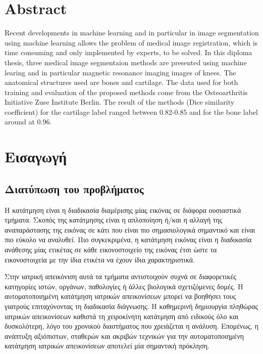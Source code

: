 \documentclass[a4paper,12pt]{article}
\begin{document}
\section*{Abstract}

Recent developments in machine learning and in particular in image segmentation
using machine learning allows the problem of medical image registration, which
is time consuming and only implemented by experts, to be solved. In this diploma
thesis, three medical image segmentaion methods are presented using machine
learing and in particular magnetic resonance imaging images of knees. The
anatomical structures used are bones and cartilage. The data used for both
training and evaluation of the proposed methods come from the Osteoarthritis
Initiative Zuse Institute Berlin. The result of the methods (Dice similarity
coefficient) for the cartilage label ranged between 0.82-0.85 and for the bone
label around at 0.96. 

\tableofcontents

\listoffigures

\listoftables

\section{Εισαγωγή}

\subsection{Διατύπωση του προβλήματος}

Η κατάτμηση είναι η διαδικασία διαμέρισης μίας εικόνας σε διάφορα ουσιαστικά
τμήματα. Σκοπός της κατάτμησης είναι η απλοποίηση ή/και η αλλαγή της
αναπαράστασης της εικόνας σε κάτι που είναι πιο σημασιολογικά σημαντικό και
είναι πιο εύκολο να αναλυθεί. Πιο συγκεκριμένα, η κατάτμηση εικόνας είναι η
διαδικασία ανάθεσης μίας ετικέτας σε κάθε εικονοστοιχείο της εικόνας έτσι ώστε
τα εικονοστοιχεία με την ίδια ετικέτα να έχουν ίδια χαρακτηριστικά.

Στην ιατρική απεικόνιση αυτά τα τμήματα αντιστοιχούν συχνά σε διαφορετικές
κατηγορίες ιστών, οργάνων, παθολογίες ή άλλες βιολογικά σχετιζόμενες δομές. Η
αυτοματοποιημένη κατάτμηση ιατρικών απεικονίσεων μπορεί να βοηθήσει τους
γιατρούς επιταχύνοντας τη διαδικασία διάγνωσης. Η καθημερινή δημιουργία πληθώρας
ιατρικών απεικονίσεων καθιστά τη χειροκίνητη κατάτμηση από ειδικούς όλο και
δυσκολότερη, λόγο του χρονικού διαστήματος που χρειάζεται η ανάλυση. Επομένως, η
ανάπτυξη αξιόπιστων, σταθερών και ακριβών τεχνικών για την αυτοματοποιημένη
κατάτμηση ιατρικών απεικονίσεων αποτελεί μία σημαντική πρόκληση.
\end{document}
